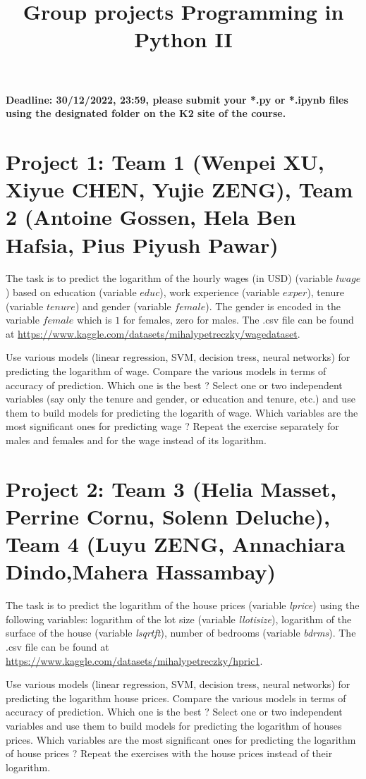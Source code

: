 \documentclass{article}
\title{Group projects Programming in Python II}
\author{}
\date{}
\begin{document}
\maketitle

\textbf{Deadline: 30/12/2022, 23:59,  please submit your *.py or *.ipynb files using the designated folder on the K2 site of the course.}



\section*{Project 1: Team 1 (Wenpei XU, Xiyue CHEN, Yujie ZENG), Team 2 (Antoine Gossen, Hela Ben Hafsia, Pius Piyush Pawar) }
  The task is to  predict the logarithm of the hourly wages (in USD) (variable $lwage$) based on education (variable $educ$), work experience (variable $exper$), tenure (variable $tenure$) and gender (variable $female$). The gender is encoded in the variable $female$ which is $1$ for   females, zero for males. 
 The .csv file can be found at \url{https://www.kaggle.com/datasets/mihalypetreczky/wagedataset}. 

 Use various models (linear regression, SVM, decision tress, neural networks) for predicting the logarithm of  wage. Compare the various models in terms of accuracy of prediction. Which one is the best ? 
 Select one or two independent variables (say only the tenure and gender, or education and tenure, etc.)  and use them to build models for predicting the logarith of wage. Which variables are the most
 significant ones for predicting  wage ? Repeat the exercise separately for males and females and for the wage instead of its logarithm. 





\section*{Project 2:  Team 3 (Helia Masset, Perrine Cornu, Solenn Deluche), Team 4  (Luyu ZENG, Annachiara Dindo,Mahera Hassambay)}
  The task is to predict the logarithm of the house prices (variable \emph{lprice}) using the following variables:
  logarithm of the lot size (variable \emph{llotisize}), logarithm of the surface of the house (variable \emph{lsqrtft}), number of bedrooms (variable \emph{bdrms}). 	
   The .csv file can be found at \url{https://www.kaggle.com/datasets/mihalypetreczky/hpric1}.  

   Use various models (linear regression, SVM, decision tress, neural networks) for predicting the logarithm house prices. Compare the various models in terms of accuracy of prediction. Which one is the best ? 
 Select one or two independent variables  and use them to build models for predicting the logarithm of houses prices. Which variables are the most
 significant ones for predicting  the logarithm of house prices  ?  Repeat the exercises with the house prices instead of their logarithm. 
 
\end{document}
